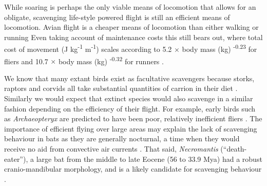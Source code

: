 \documentclass[a4paper,12pt]{article}
\begin{document}
While soaring is perhaps the only viable means of locomotion that allows for an obligate, scavenging life-style \citep{ruxton2004obligate} powered flight is still an efficient means of locomotion. 
Avian flight is a cheaper means of locomotion than either walking or running \citep{tucker1975energetic} 
Even taking account of maintenance costs this still bears out, where total cost of movement (J kg\textsuperscript{-1} m\textsuperscript{-1}) scales according to 5.2 $\times$ body mass (kg) \textsuperscript{-0.23} for fliers and 10.7 $\times$ body mass (kg) \textsuperscript{-0.32} for runners \citep{williams1999evolution}.  

We know that many extant birds exist as facultative scavengers because storks, raptors and corvids all take substantial quantities of carrion in their diet \citep{kendall2013alternative}. 
Similarly we would expect that extinct species would also scavenge in a similar fashion depending on the efficiency of their flight. 
For example, early birds such as \textit{Archaeopteryx} are predicted to have been poor, relatively inefficient fliers \citep{nudds2010narrow}. 
The importance of efficient flying over large areas may explain the lack of scavenging behaviour in bats as they are generally nocturnal, a time when they would receive no aid from convective air currents \citep{norberg2012vertebrate}. 
That said, \textit{Necromantis} (``death-eater''), a large bat from the middle to late Eocene (56 to 33.9 Mya) had a robust cranio-mandibular morphology, and is a likely candidate for scavenging behaviour \citep{Weithofer_Necromantis_1887,Hand_Necromantis_2012}.%
\end{document}
